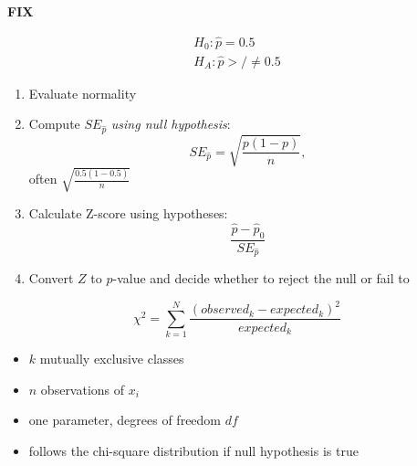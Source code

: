 
\textbf{FIX}

\begin{eqnarray}
  H_0: \hat{p} = 0.5 \\
  H_A: \hat{p} >/\neq 0.5
\end{eqnarray}

\begin{enumerate}
	\item Evaluate normality
	\item Compute $SE_{\hat{p}}$ \textit{using null hypothesis}:
		\begin{equation}
			SE_{\hat{p}} = \sqrt{\frac{p(1-p)}{n}},
		\end{equation}
		often $ \sqrt{\frac{0.5(1-0.5)}{n}}$
	\item Calculate Z-score using hypotheses:
		\begin{equation}
			\frac{\hat{p} - \hat{p}_0}{SE_{\hat{p}}}
		\end{equation}	
	\item Convert $Z$ to $p$-value and decide whether to reject the null or fail to
\end{enumerate}

\hformbar



\hformbar



\hformbar



\hformbar



\hformbar



\hformbar





\begin{equation}
	\chi^2 = \sum_{k=1}^N \frac{ (observed_k - expected_k)^2 }{ expected_k }
\end{equation}

\begin{itemize}
	\item $k$ mutually exclusive classes
	\item $n$ observations of $x_i$
	\item one parameter, degrees of freedom $df$
	\item follows the chi-square distribution if null hypothesis is true
\end{itemize}

